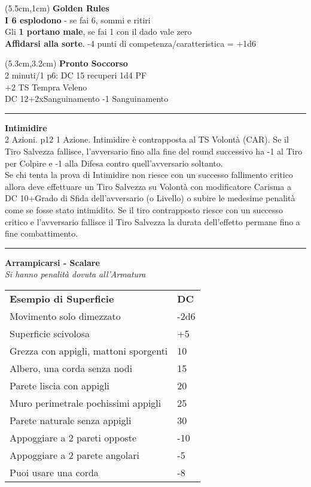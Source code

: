 \documentclass[a4paper,12 pt,openany]{book}
\newcommand{\riga}{\rule{\textwidth}{0.4pt}}
\begin{document}
\begin{textblock*}{14.5cm}(5.5cm,1cm) %
\textbf{Golden Rules}\\

{\textbf{I 6 esplodono}} - se fai 6, sommi e ritiri\\
Gli \textbf{1 portano male}, se fai 1 con il dado vale zero\\
\textbf{Affidarsi alla sorte}. -4 punti di competenza/caratteristica = +1d6\\
\end{textblock*}


\begin{textblock*}{7.4cm}(5.3cm,3.2cm) %
\textbf{Pronto Soccorso}\\
2 minuti/1 p6: DC 15 recuperi 1d4 PF\\
+2 TS Tempra Veleno\\
DC 12+2xSanguinamento -1 Sanguinamento

\riga

\textbf{Intimidire}\\
2 Azioni. p12 1 Azione. Intimidire è contrapposta al TS Volontà (CAR). Se il Tiro Salvezza fallisce, l’avversario fino alla fine del round successivo ha -1 al Tiro per Colpire e -1 alla Difesa contro quell’avversario soltanto.\\
Se chi tenta la prova di Intimidire non riesce con un successo fallimento critico allora deve effettuare un Tiro Salvezza su Volontà con modificatore Carisma a DC 10+Grado di Sfida dell'avversario (o Livello) o subire le medesime penalità come se fosse stato intimidito.
Se il tiro contrapposto riesce con un successo critico e l'avversario fallisce il Tiro Salvezza la durata dell'effetto permane fino a fine combattimento.

\riga

\textbf{Arrampicarsi - Scalare}\\
\textit{Si hanno penalità dovuta all'Armatura}

\begin{tabular}{ll}
\textbf{Esempio di Superficie} & \textbf{DC}\\
Movimento solo dimezzato & -2d6\\
Superficie scivolosa&+5\\
Grezza con appigli, mattoni sporgenti&10\\
Albero, una corda senza nodi&15\\
Parete liscia con appigli &20\\
Muro perimetrale pochissimi appigli&25\\
Parete naturale senza appigli&30\\
Appoggiare a 2 pareti opposte&-10\\
Appoggiare a 2 parete angolari&-5\\
Puoi usare una corda&-8\\
\end{tabular}


\end{textblock*}
\end{document}
